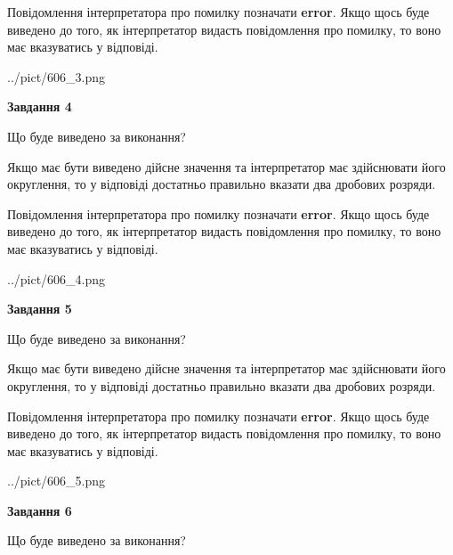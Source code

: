 \documentclass[12pt, ukrainian]{article}
\begin{document}
{\begin {Large}
Повідомлення інтерпретатора про помилку позначати \textbf{error}.
Якщо щось буде виведено до того, як інтерпретатор видасть повідомлення про помилку, 
то воно має вказуватись у відповіді. \par

\begin{center}
	{../pict/606_3.png}
\end{center}
\newpage

{\begin {center}\textbf{Завдання 4}\end {center}}\par
Що буде виведено за виконання? \par

Якщо має бути виведено дійсне значення та інтерпретатор має здійснювати його округлення, 
то у відповіді достатньо правильно вказати два дробових розряди.

Повідомлення інтерпретатора про помилку позначати \textbf{error}.
Якщо щось буде виведено до того, як інтерпретатор видасть повідомлення про помилку, 
то воно має вказуватись у відповіді. \par

\begin{center}
	{../pict/606_4.png}
\end{center}
\newpage

{\begin {center}\textbf{Завдання 5}\end {center}}\par
Що буде виведено за виконання? \par

Якщо має бути виведено дійсне значення та інтерпретатор має здійснювати його округлення, 
то у відповіді достатньо правильно вказати два дробових розряди.

Повідомлення інтерпретатора про помилку позначати \textbf{error}.
Якщо щось буде виведено до того, як інтерпретатор видасть повідомлення про помилку, 
то воно має вказуватись у відповіді. \par

\begin{center}
	{../pict/606_5.png}
\end{center}
\newpage

{\begin {center}\textbf{Завдання 6}\end {center}}\par
Що буде виведено за виконання? \par


\end{Large}}
\end{document}
